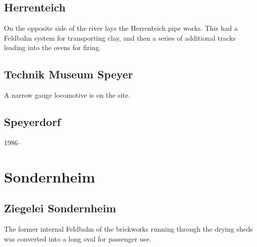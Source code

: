 \documentclass[a4paper]{report}
\begin{document}
\subsection{Herrenteich}

On the opposite side of the river lays the Herrenteich pipe works.
This had a Feldbahn system for transporting clay, and then a series of
additional tracks leading into the ovens for firing.

\subsection{Technik Museum Speyer}

A narrow gauge locomotive is on the site.

\subsection{Speyerdorf}

1986--

\section{Sondernheim}

\subsection{Ziegelei Sondernheim}

The former internal Feldbahn of the brickworks running through the
drying sheds was converted into a long oval for passenger use.


\nocite{*} 
\end{document}
